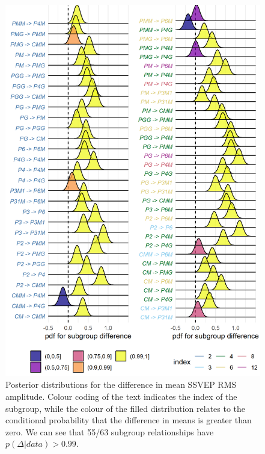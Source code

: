 \documentclass[11pt, twoside]{article}
\begin{document}
\begin{figure}[hp]
\centering
\includegraphics[width=0.8\linewidth]{../analysis/plots/subgroup_comp_eeg_rms.png}
\caption{Posterior distributions for the difference in mean SSVEP RMS amplitude. Colour coding of the text indicates the index of the subgroup, while the colour of the filled distribution relates to the conditional probability that the difference in means is greater than zero. We can see that 55/63 subgroup relationships have $p(\Delta|data)>0.99$.}
\label{fig:eeg_comp}
\end{figure}
\end{document}

